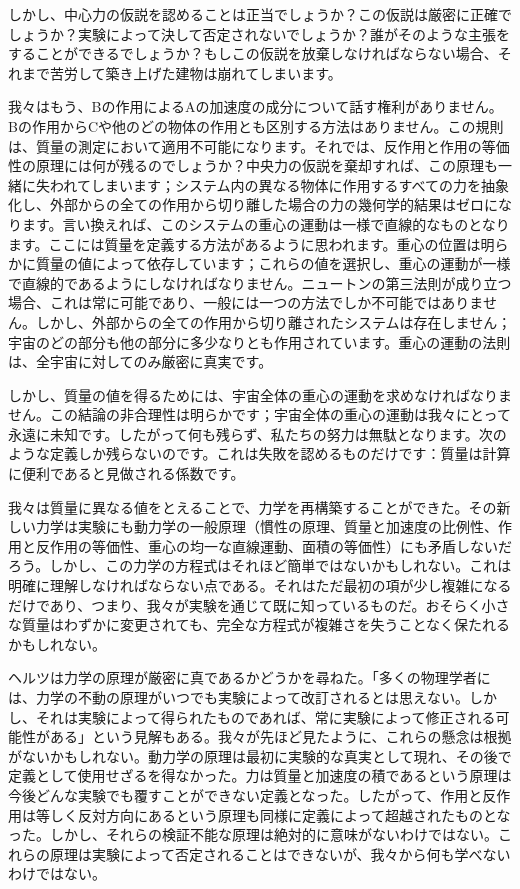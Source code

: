 \documentclass[a4paper,11pt,openany]{ltjsbook}
\begin{document}
しかし、中心力の仮説を認めることは正当でしょうか？この仮説は厳密に正確でしょうか？実験によって決して否定されないでしょうか？誰がそのような主張をすることができるでしょうか？もしこの仮説を放棄しなければならない場合、それまで苦労して築き上げた建物は崩れてしまいます。

我々はもう、Bの作用によるAの加速度の成分について話す権利がありません。Bの作用からCや他のどの物体の作用とも区別する方法はありません。この規則は、質量の測定において適用不可能になります。それでは、反作用と作用の等価性の原理には何が残るのでしょうか？中央力の仮説を棄却すれば、この原理も一緒に失われてしまいます；システム内の異なる物体に作用するすべての力を抽象化し、外部からの全ての作用から切り離した場合の力の幾何学的結果はゼロになります。言い換えれば、このシステムの重心の運動は一様で直線的なものとなります。ここには質量を定義する方法があるように思われます。重心の位置は明らかに質量の値によって依存しています；これらの値を選択し、重心の運動が一様で直線的であるようにしなければなりません。ニュートンの第三法則が成り立つ場合、これは常に可能であり、一般には一つの方法でしか不可能ではありません。しかし、外部からの全ての作用から切り離されたシステムは存在しません；宇宙のどの部分も他の部分に多少なりとも作用されています。重心の運動の法則は、全宇宙に対してのみ厳密に真実です。

しかし、質量の値を得るためには、宇宙全体の重心の運動を求めなければなりません。この結論の非合理性は明らかです；宇宙全体の重心の運動は我々にとって永遠に未知です。したがって何も残らず、私たちの努力は無駄となります。次のような定義しか残らないのです。これは失敗を認めるものだけです：質量は計算に便利であると見做される係数です。

我々は質量に異なる値をとえることで、力学を再構築することができた。その新しい力学は実験にも動力学の一般原理（慣性の原理、質量と加速度の比例性、作用と反作用の等価性、重心の均一な直線運動、面積の等価性）にも矛盾しないだろう。しかし、この力学の方程式はそれほど簡単ではないかもしれない。これは明確に理解しなければならない点である。それはただ最初の項が少し複雑になるだけであり、つまり、我々が実験を通じて既に知っているものだ。おそらく小さな質量はわずかに変更されても、完全な方程式が複雑さを失うことなく保たれるかもしれない。

ヘルツは力学の原理が厳密に真であるかどうかを尋ねた。「多くの物理学者には、力学の不動の原理がいつでも実験によって改訂されるとは思えない。しかし、それは実験によって得られたものであれば、常に実験によって修正される可能性がある」という見解もある。我々が先ほど見たように、これらの懸念は根拠がないかもしれない。動力学の原理は最初に実験的な真実として現れ、その後で定義として使用せざるを得なかった。力は質量と加速度の積であるという原理は今後どんな実験でも覆すことができない定義となった。したがって、作用と反作用は等しく反対方向にあるという原理も同様に定義によって超越されたものとなった。しかし、それらの検証不能な原理は絶対的に意味がないわけではない。これらの原理は実験によって否定されることはできないが、我々から何も学べないわけではない。
\end{document}
